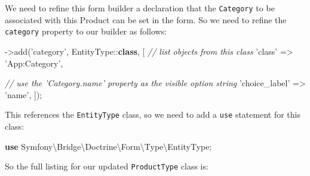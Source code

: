 \documentclass[a4paperpaper,openright]{book}
\newenvironment{Shaded}{}{}
\newcommand{\CommentTok}[1]{\textcolor[rgb]{0.38,0.63,0.69}{\textit{#1}}}
\newcommand{\KeywordTok}[1]{\textcolor[rgb]{0.00,0.44,0.13}{\textbf{#1}}}
\newcommand{\NormalTok}[1]{#1}
\newcommand{\OtherTok}[1]{\textcolor[rgb]{0.00,0.44,0.13}{#1}}
\newcommand{\StringTok}[1]{\textcolor[rgb]{0.25,0.44,0.63}{#1}}
\begin{document}
We need to refine this form builder a declaration that the
\texttt{Category} to be associated with this Product can be set in the
form. So we need to refine the \texttt{category} property to our builder
as follows:

\begin{Shaded}
\begin{Highlighting}[]
\NormalTok{    ->add}\OtherTok{(}\StringTok{'category'}\OtherTok{,}\NormalTok{ EntityType::}\KeywordTok{class}\OtherTok{,} \OtherTok{[}
              \CommentTok{// list objects from this class}
              \StringTok{'class'}\NormalTok{ => }\StringTok{'App:Category'}\OtherTok{,}

              \CommentTok{// use the 'Category.name' property as the visible option string}
              \StringTok{'choice_label'}\NormalTok{ => }\StringTok{'name'}\OtherTok{,}
          \OtherTok{]);}
\end{Highlighting}
\end{Shaded}

This references the \texttt{EntityType} class, so we need to add a
\texttt{use} statement for this class:

\begin{Shaded}
\begin{Highlighting}[]
    \KeywordTok{use}\NormalTok{ Symfony\textbackslash{}Bridge\textbackslash{}Doctrine\textbackslash{}Form\textbackslash{}Type\textbackslash{}EntityType}\OtherTok{;}
\end{Highlighting}
\end{Shaded}

So the full listing for our updated \texttt{ProductType} class is:
\end{document}
